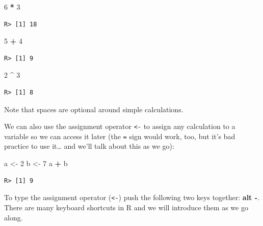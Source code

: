 \documentclass[]{book}
\newenvironment{Shaded}{\begin{snugshade}}{\end{snugshade}}
\newcommand{\DecValTok}[1]{\textcolor[rgb]{0.00,0.00,0.81}{#1}}
\newcommand{\StringTok}[1]{\textcolor[rgb]{0.31,0.60,0.02}{#1}}
\newcommand{\OperatorTok}[1]{\textcolor[rgb]{0.81,0.36,0.00}{\textbf{#1}}}
\newcommand{\NormalTok}[1]{#1}
\theoremstyle{definition}
\theoremstyle{definition}
\theoremstyle{definition}
\theoremstyle{remark}
\begin{document}
\begin{Shaded}
\begin{Highlighting}[]
\DecValTok{6} \OperatorTok{*}\StringTok{ }\DecValTok{3}
\end{Highlighting}
\end{Shaded}

\begin{verbatim}
R> [1] 18
\end{verbatim}

\begin{Shaded}
\begin{Highlighting}[]
\DecValTok{5} \OperatorTok{+}\StringTok{ }\DecValTok{4}
\end{Highlighting}
\end{Shaded}

\begin{verbatim}
R> [1] 9
\end{verbatim}

\begin{Shaded}
\begin{Highlighting}[]
\DecValTok{2} \OperatorTok{^}\StringTok{ }\DecValTok{3}
\end{Highlighting}
\end{Shaded}

\begin{verbatim}
R> [1] 8
\end{verbatim}

Note that spaces are optional around simple calculations.

We can also use the assignment operator \texttt{\textless{}-} to assign
any calculation to a variable so we can access it later (the \texttt{=}
sign would work, too, but it's bad practice to use it\ldots{} and we'll
talk about this as we go):

\begin{Shaded}
\begin{Highlighting}[]
\NormalTok{a <-}\StringTok{ }\DecValTok{2}
\NormalTok{b <-}\StringTok{ }\DecValTok{7}
\NormalTok{a }\OperatorTok{+}\StringTok{ }\NormalTok{b}
\end{Highlighting}
\end{Shaded}

\begin{verbatim}
R> [1] 9
\end{verbatim}

To type the assignment operator (\texttt{\textless{}-}) push the
following two keys together: \textbf{alt -}. There are many keyboard
shortcuts in R and we will introduce them as we go along.
\end{document}
